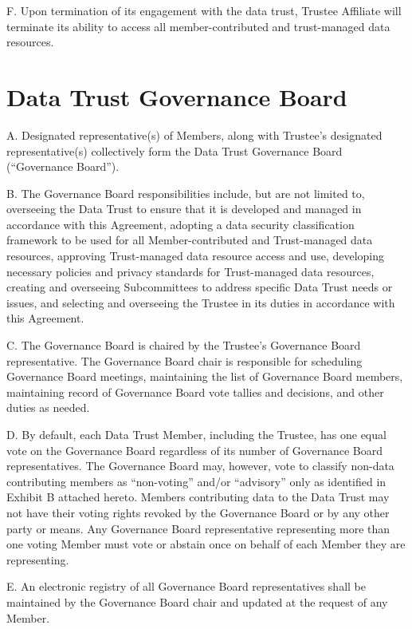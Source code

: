 \documentclass[]{book}
\begin{document}
F. Upon termination of its engagement with the data trust, Trustee Affiliate will terminate its ability to access all member-contributed and trust-managed data resources.

\hypertarget{data-trust-governance-board}{%
\chapter{Data Trust Governance Board}\label{data-trust-governance-board}}

A. Designated representative(s) of Members, along with Trustee's designated representative(s) collectively form the Data Trust Governance Board (``Governance Board'').

B. The Governance Board responsibilities include, but are not limited to, overseeing the Data Trust to ensure that it is developed and managed in accordance with this Agreement, adopting a data security classification framework to be used for all Member-contributed and Trust-managed data resources, approving Trust-managed data resource access and use, developing necessary policies and privacy standards for Trust-managed data resources, creating and overseeing Subcommittees to address specific Data Trust needs or issues, and selecting and overseeing the Trustee in its duties in accordance with this Agreement.

C. The Governance Board is chaired by the Trustee's Governance Board representative. The Governance Board chair is responsible for scheduling Governance Board meetings, maintaining the list of Governance Board members, maintaining record of Governance Board vote tallies and decisions, and other duties as needed.

D. By default, each Data Trust Member, including the Trustee, has one equal vote on the Governance Board regardless of its number of Governance Board representatives. The Governance Board may, however, vote to classify non-data contributing members as ``non-voting'' and/or ``advisory'' only as identified in Exhibit B attached hereto. Members contributing data to the Data Trust may not have their voting rights revoked by the Governance Board or by any other party or means. Any Governance Board representative representing more than one voting Member must vote or abstain once on behalf of each Member they are representing.

E. An electronic registry of all Governance Board representatives shall be maintained by the Governance Board chair and updated at the request of any Member.
\end{document}
